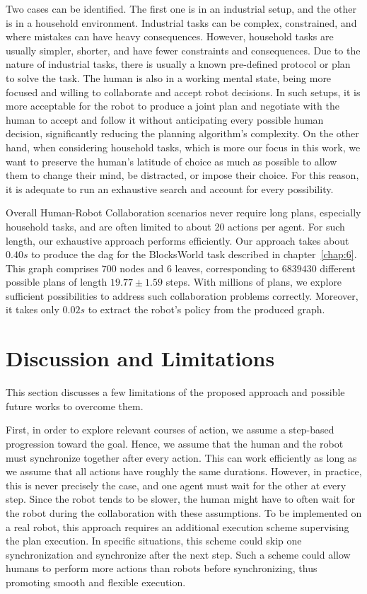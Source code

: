 Two cases can be identified. The first one is in an industrial setup, and the other is in a household environment. Industrial tasks can be complex, constrained, and where mistakes can have heavy consequences. However, household tasks are usually simpler, shorter, and have fewer constraints and consequences. Due to the nature of industrial tasks, there is usually a known pre-defined protocol or plan to solve the task. The human is also in a working mental state, being more focused and willing to collaborate and accept robot decisions. In such setups, it is more acceptable for the robot to produce a joint plan and negotiate with the human to accept and follow it without anticipating every possible human decision, significantly reducing the planning algorithm's complexity.
On the other hand, when considering household tasks, which is more our focus in this work, we want to preserve the human's latitude of choice as much as possible to allow them to change their mind, be distracted, or impose their choice. For this reason, it is adequate to run an exhaustive search and account for every possibility. 

Overall Human-Robot Collaboration scenarios never require long plans, especially household tasks, and are often limited to about 20 actions per agent. For such length, our exhaustive approach performs efficiently. Our approach takes about $0.40s$ to produce the \acrshort{dag} for the BlocksWorld task described in chapter~\ref{chap:6}. This graph comprises $700$ nodes and $6$ leaves, corresponding to $6839430$ different possible plans of length $19.77 \pm 1.59$ steps. With millions of plans, we explore sufficient possibilities to address such collaboration problems correctly. Moreover, it takes only $0.02s$ to extract the robot's policy from the produced graph. 


\section{Discussion and Limitations}


This section discusses a few limitations of the proposed approach and possible future works to overcome them. 

First, in order to explore relevant courses of action, we assume a step-based progression toward the goal. Hence, we assume that the human and the robot must synchronize together after every action. This can work efficiently as long as we assume that all actions have roughly the same durations. However, in practice, this is never precisely the case, and one agent must wait for the other at every step. Since the robot tends to be slower, the human might have to often wait for the robot during the collaboration with these assumptions. To be implemented on a real robot, this approach requires an additional execution scheme supervising the plan execution. In specific situations, this scheme could skip one synchronization and synchronize after the next step. Such a scheme could allow humans to perform more actions than robots before synchronizing, thus promoting smooth and flexible execution.

